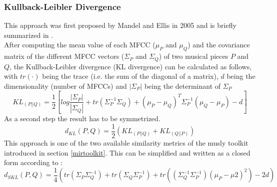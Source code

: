 \subsubsection{Kullback-Leibler Divergence}

This approach was first proposed by Mandel and Ellis \cite{mandelellis1} in 2005 and is briefly summarized in \cite[pp. 65f]{knees1}.\\
After computing the mean value of each MFCC ($\mu_P$ and $\mu_Q$) and the covariance matrix of the different MFCC vectors ($\Sigma_P$ and $\Sigma_Q$) of two musical pieces $P$ and $Q$, the Kullback-Leibler divergence (KL divergence) can be calculated as follows, with $tr(\cdot)$ being the trace (i.e. the sum of the diagonal of a matrix), $d$ being the dimensionality (number of MFCCs) and $|\Sigma_P|$ being the determinant of $\Sigma_P$\\
\begin{equation} \label{eq:KL1}
KL_{(P||Q)} = \frac{1}{2}[log\frac{|\Sigma_P|}{|\Sigma_Q|} + tr(\Sigma_P^{-1}\Sigma_Q) + (\mu_P - \mu_Q)^T \Sigma_P^{-1} (\mu_Q - \mu_P) - d]
\end{equation}
As a second step the result has to be symmetrized.
\begin{equation} \label{eq:KL2}
d_{KL}(P, Q) = \frac{1}{2} (KL_{(P||Q)} + KL_{(Q||P)}) 
\end{equation}
This approach is one of the two available similarity metrics of the musly \cite{musly1} toolkit introduced in section \ref{mirtoolkit}.
This can be simplified and written as a closed form according to \cite[p. 44]{schnitzer1}:
\begin{equation} \label{eq:SKL}
d_{SKL}(P, Q) = \frac{1}{4} (tr(\Sigma_P\Sigma_Q^{-1}) + tr(\Sigma_Q\Sigma_P^{-1}) + tr((\Sigma_Q^{-1}\Sigma_P^{-1})(\mu_P - \mu2)^2) - 2d)
\end{equation}

